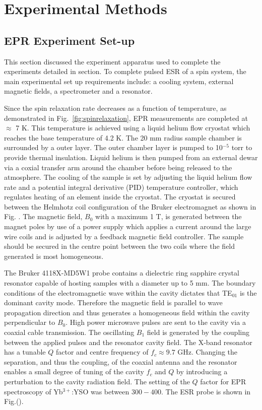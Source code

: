 \chapter{Experimental Methods}
\section{\label{sec:EPRexperimentsetup}EPR Experiment Set-up}
This section discussed the experiment apparatus used to complete the experiments detailed in section. To complete pulsed ESR of a spin system, the main experimental set up requirements include: a cooling system, external magnetic fields, a spectrometer and a resonator. 


Since the spin relaxation rate decreases as a function of temperature, as demonstrated in Fig.~\ref{fig:spinrelaxation}, EPR measurements are completed at $\approx$ 7 K. This temperature is achieved using a liquid helium flow cryostat which reaches the base temperature of 4.2 K. The 20 mm radius sample chamber is surrounded by a outer layer. The outer chamber layer is pumped to 10$^{-5}$ torr to provide thermal insulation. Liquid helium is then pumped from an external dewar via a coxial transfer arm around the chamber before being released to the atmosphere. The cooling of the sample is set by adjusting the liquid helium flow rate and a potential integral derivative (PID) temperature controller, which regulates heating of an element inside the cryostat. The cryostat is secured between the Helmhotz coil configuration of the Bruker electromagnet as shown in Fig. . The magnetic field, $B_{0}$ with a maximum 1 T, is generated between the magnet poles by use of a power supply which applies a current around the large wire coils and is adjusted by a feedback magnetic field controller. The sample should be secured in the centre point between the two coils where the field generated is most homogeneous.       

The Bruker 4118X-MD5W1 probe contains a dielectric ring sapphire crystal resonator capable of hosting samples with a diameter up to 5 mm. The boundary conditions of the electromagnetic wave within the cavity dictates that TE$_{01}$ is the dominant cavity mode. Therefore the magnetic field is parallel to wave propagation direction and thus generates a homogeneous field within the cavity perpendicular to $B_{0}$. High power microwave pulses are sent to the cavity via a coaxial cable transmission. The oscillating $B_{1}$ field is generated by the coupling between the applied pulses and the resonator cavity field. The X-band resonator has a tunable $Q$ factor and centre frequency of $f_{c} \approx 9.7$ GHz. Changing the separation, and thus the coupling, of the coaxial antenna and the resonator enables a small degree of tuning of the cavity $f_{c}$ and $Q$ by introducing a perturbation to the cavity radiation field. The setting of the $Q$ factor for EPR spectroscopy of Yb$^{3+}$:YSO was between $300-400$. The ESR probe is shown in Fig.().        

